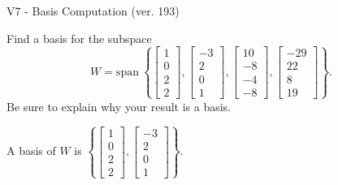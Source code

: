 \begin{exercise}
  \begin{exerciseTitle}V7 - Basis Computation (ver. 193)\end{exerciseTitle}
  \begin{exerciseStatement}
    Find a basis for the subspace 
\[W=\mathrm{span}\ \left\{\left[\begin{array}{r}
1 \\
0 \\
2 \\
2
\end{array}\right] , \left[\begin{array}{r}
-3 \\
2 \\
0 \\
1
\end{array}\right] , \left[\begin{array}{r}
10 \\
-8 \\
-4 \\
-8
\end{array}\right] , \left[\begin{array}{r}
-29 \\
22 \\
8 \\
19
\end{array}\right]\right\}.\]
 Be sure to explain why your result is a basis.


  \end{exerciseStatement}
  \begin{exerciseAnswer}
   A basis of \(W\) is  \(\left\{\left[\begin{array}{r}
1 \\
0 \\
2 \\
2
\end{array}\right] , \left[\begin{array}{r}
-3 \\
2 \\
0 \\
1
\end{array}\right]\right\}\).
  


  \end{exerciseAnswer}
\end{exercise}